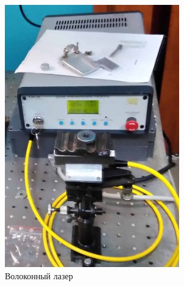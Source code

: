 \documentclass[10pt,pdf,hyperref={unicode}, dvipsnames]{beamer}
\begin{document}
\begin{frame}[t]
\begin{columns}
\begin{column}{0.3\textwidth}
\begin{figure}[h]
				\includegraphics[width=0.8\textwidth]{photo/las_f}
				\caption{Волоконный лазер}
			\end{figure}	
		\end{column}
		\begin{column}{0.3\textwidth}
			\begin{figure}[h]
				\centering

\end{figure}
\end{column}
\end{columns}
\end{frame}
\end{document}
